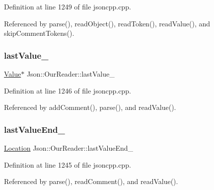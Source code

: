 Definition at line 1249 of file jsoncpp.\+cpp.



Referenced by parse(), read\+Object(), read\+Token(), read\+Value(), and skip\+Comment\+Tokens().

\mbox{\label{class_json_1_1_our_reader_a9f994b6a2227c5d96e6ed6cbc74ed251}} 
\subsubsection{\texorpdfstring{last\+Value\+\_\+}{lastValue\_}}
{\footnotesize\ttfamily \hyperlink{class_json_1_1_value}{Value}$\ast$ Json\+::\+Our\+Reader\+::last\+Value\+\_\+\hspace{0.3cm}{\ttfamily [private]}}



Definition at line 1246 of file jsoncpp.\+cpp.



Referenced by add\+Comment(), parse(), and read\+Value().

\mbox{\label{class_json_1_1_our_reader_a101eadc45e01c60628b53f0db3d13482}} 
\subsubsection{\texorpdfstring{last\+Value\+End\+\_\+}{lastValueEnd\_}}
{\footnotesize\ttfamily \hyperlink{class_json_1_1_our_reader_a1bdc7bbc52ba87cae6b19746f2ee0189}{Location} Json\+::\+Our\+Reader\+::last\+Value\+End\+\_\+\hspace{0.3cm}{\ttfamily [private]}}



Definition at line 1245 of file jsoncpp.\+cpp.



Referenced by parse(), read\+Comment(), and read\+Value().

\mbox{\label{class_json_1_1_our_reader_a19cc4e8c5d17ee6822f752e9a36f4ce3}} 
